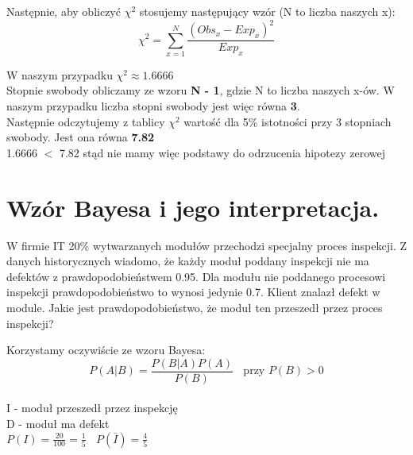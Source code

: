 \documentclass[main.tex]{subfiles}
\begin{document}
    Następnie, aby obliczyć $\chi^{2}$ stosujemy następujący wzór (N to liczba naszych x):
    \begin{equation*}
        \chi^{2} = \sum_{x=1}^{N} \frac{(Obs_{x} - Exp_{x})^{2}}{Exp_{x}}
    \end{equation*}

    W naszym przypadku $\chi^{2} \approx 1.6666$ \\

    Stopnie swobody obliczamy ze wzoru \textbf{N - 1}, gdzie N to liczba naszych x-ów. W naszym przypadku liczba stopni swobody jest więc równa \textbf{3}. \\

    Następnie odczytujemy z tablicy $\chi^{2}$ wartość dla 5\% istotności przy 3 stopniach swobody. Jest ona równa \textbf{7.82} \\

    1.6666 $<$ 7.82 stąd nie mamy więc podstawy do odrzucenia hipotezy zerowej

    \newpage






    \section{Wzór Bayesa i jego interpretacja.}
    \begin{exercise}
        W firmie IT 20\% wytwarzanych modułów przechodzi specjalny proces inspekcji. Z danych historycznych wiadomo, że każdy moduł poddany inspekcji nie ma defektów z prawdopodobieństwem 0.95. Dla modułu nie poddanego procesowi inspekcji prawdopodobieństwo to wynosi jedynie 0.7. Klient znalazł defekt w module. Jakie jest prawdopodobieństwo, że moduł ten przeszedł przez proces inspekcji?
    \end{exercise}

    Korzystamy oczywiście ze wzoru Bayesa:
    \begin{equation*}
        P(A|B) = \frac{P(B|A)P(A)}{P(B)} ~ ~ ~ ~ \text{przy $P(B) > 0$}
    \end{equation*} \\

    I - moduł przeszedł przez inspekcję \\
    D - moduł ma defekt \\

    $P(I) = \frac{20}{100} = \frac{1}{5} ~ ~ ~ ~ P(\bar{I}) = \frac{4}{5}$ \\
\end{document}
